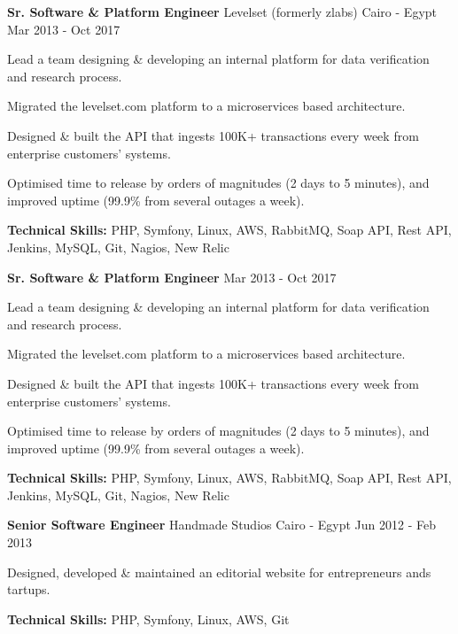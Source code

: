 \begin{cventries}
  \cventry
    {\textbf{Sr. Software \& Platform Engineer}} %
    {Levelset (formerly zlabs)} %
    {Cairo - Egypt} %
    {Mar 2013 - Oct 2017} %
    {
      \begin{cvitems} %
        \item {Lead a team designing \& developing an internal platform for data verification and
          research process.}
        \item {Migrated the levelset.com platform to a microservices based architecture.}
        \item {Designed \& built the API that ingests 100K+ transactions every week from enterprise
          customers’ systems.}
        \item {Optimised time to release by orders of magnitudes (2 days to 5 minutes), and improved
          uptime (99.9\% from several outages a week).}
        \item {\textbf{Technical Skills:} PHP, Symfony, Linux, AWS, RabbitMQ, Soap API, Rest API,
          Jenkins, MySQL, Git, Nagios, New Relic}
      \end{cvitems}
    }
  \cventry
    {\textbf{Sr. Software \& Platform Engineer}} %
    {} %
    {} %
    {Mar 2013 - Oct 2017} %
    {
      \begin{cvitems} %
        \item {Lead a team designing \& developing an internal platform for data verification and
          research process.}
        \item {Migrated the levelset.com platform to a microservices based architecture.}
        \item {Designed \& built the API that ingests 100K+ transactions every week from enterprise
          customers’ systems.}
        \item {Optimised time to release by orders of magnitudes (2 days to 5 minutes), and improved
          uptime (99.9\% from several outages a week).}
        \item {\textbf{Technical Skills:} PHP, Symfony, Linux, AWS, RabbitMQ, Soap API, Rest API,
          Jenkins, MySQL, Git, Nagios, New Relic}
      \end{cvitems}
    }

  \cventry
    {\textbf{Senior Software Engineer}} %
    {Handmade Studios} %
    {Cairo - Egypt} %
    {Jun 2012 - Feb 2013} %
    {
      \begin{cvitems} %
        \item {Designed, developed \& maintained an editorial website for entrepreneurs ands
          tartups.}
        \item {\textbf{Technical Skills:} PHP, Symfony, Linux, AWS, Git}
      \end{cvitems}
    }



\end{cventries}
